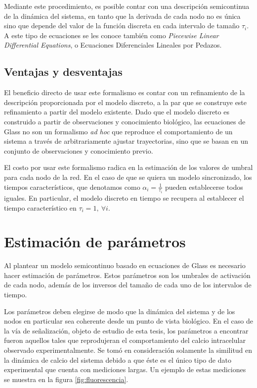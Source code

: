 Mediante este procedimiento, es posible contar con una descripción semicontinua de la dinámica del sistema, en tanto que la derivada de cada nodo no es única sino que depende del valor de la función discreta en cada intervalo de tamaño $\tau_i$. A este tipo de ecuaciones se les conoce también como \emph{Piecewise Linear Differential Equations}, o Ecuaciones Diferenciales Lineales por Pedazos.

\subsection{Ventajas y desventajas}

El beneficio directo de usar este formalismo es contar con un refinamiento de la descripción proporcionada por el modelo discreto, a la par que se construye este refinamiento a partir del modelo existente. Dado que el modelo discreto es construido a partir de observaciones y conocimiento biológico, las ecuaciones de Glass no son un formalismo \emph{ad hoc} que reproduce el comportamiento de un sistema a través de arbitrariamente ajustar trayectorias, sino que se basan en un conjunto de observaciones y conocimiento previo.

El costo por usar este formalismo radica en la estimación de los valores de umbral para cada nodo de la red. En el caso de que se quiera un modelo sincronizado, los tiempos característicos, que denotamos como $\alpha_i=\frac{1}{\tau_i}$ pueden establecerse todos iguales. En particular, el modelo discreto en tiempo se recupera al establecer el tiempo característico en $\tau_i = 1,\ \forall i$.

\section{Estimación de parámetros}

Al plantear un modelo semicontinuo basado en ecuaciones de Glass es necesario hacer estimación de parámetros. Estos parámetros son los umbrales de activación de cada nodo, además de los inversos del tamaño de cada uno de los intervalos de tiempo.

Los parámetros deben elegirse de modo que la dinámica del sistema y de los nodos en particular sea coherente desde un punto de vista biológico. En el caso de la vía de señalización, objeto de estudio de esta tesis, los parámetros a encontrar fueron aquellos tales que reprodujeran el comportamiento del calcio intracelular observado experimentalmente. Se tomó en consideración solamente la similitud en la dinámica de calcio del sistema debido a que éste es el único tipo de dato experimental que cuenta con mediciones largas. Un ejemplo de estas mediciones se muestra en la figura \ref{fig:fluorescencia}.

